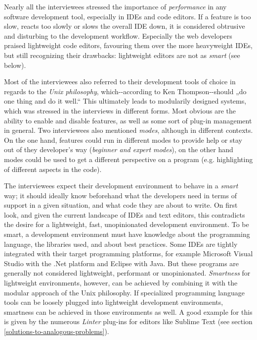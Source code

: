 Nearly all the interviewees stressed the importance of
\emph{performance} in any software development tool, especially in IDEs
and code editors. If a feature is too slow, reacts too slowly or slows
the overall IDE down, it is considered obtrusive and disturbing to the
development workflow. Especially the web developers praised lightweight
code editors, favouring them over the more heavyweight IDEs, but still
recognizing their drawbacks: lightweight editors are not as \emph{smart}
(see below).

Most of the interviewees also referred to their development tools of
choice in regards to the \emph{Unix philosophy}, which-{}-according to
Ken Thompson-{}-should „do one thing and do it well.“ \cite{raymond}
This ultimately leads to modularily designed systems, which was stressed
in the interviews in different forms. Most obvious are the ability to
enable and disable features, as well as some sort of plug-in management
in general. Two interviewees also mentioned \emph{modes}, although in
different contexts. On the one hand, features could run in different
modes to provide help or stay out of they developer’s way
(\emph{beginner and expert modes}), on the other hand modes could be
used to get a different perspective on a program (e.g. highlighting of
different aspects in the code).

The interviewees expect their development environment to behave in a
\emph{smart} way; it should ideally know beforehand what the developers
need in terms of support in a given situation, and what code they are
about to write. On first look, and given the current landscape of IDEs
and text editors, this contradicts the desire for a lightweight, fast,
unopinionated development environment. To be smart, a development
environment must have knowledge about the programming language, the
libraries used, and about best practices. Some IDEs are tightly
integrated with their target programming platforms, for example
Microsoft Visual Studio with the .Net platform and Eclipse with Java.
But these programs are generally not considered lightweight, performant
or unopinionated. \emph{Smartness} for lightweight environments,
however, can be achieved by combining it with the modular approach of
the Unix philosophy. If specialized programming language tools can be
loosely plugged into lightweight development environments, smartness can
be achieved in those environments as well. A good example for this is
given by the numerous \emph{Linter} plug-ins for editors like Sublime
Text (see section \ref{solutions-to-analogous-problems}).

